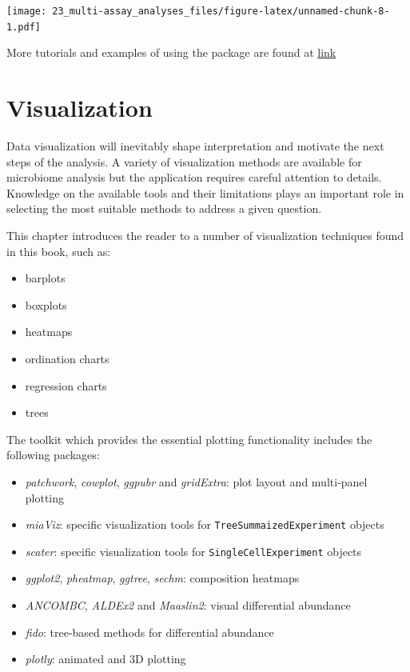 \documentclass[
]{book}
\providecommand{\tightlist}{%
  \setlength{\itemsep}{0pt}\setlength{\parskip}{0pt}}
\begin{document}
\texttt{[image: 23\_multi-assay\_analyses\_files/figure-latex/unnamed-chunk-8-1.pdf]}

More tutorials and examples of using the package are found at \href{https://biofam.github.io/MOFA2/tutorials.html}{link}

\hypertarget{viz-chapter}{%
\chapter{Visualization}\label{viz-chapter}}

Data visualization will inevitably shape interpretation and motivate
the next steps of the analysis. A variety of visualization methods are
available for microbiome analysis but the application requires careful
attention to details. Knowledge on the available tools and their
limitations plays an important role in selecting the most suitable
methods to address a given question.

This chapter introduces the reader to a number of visualization
techniques found in this book, such as:

\begin{itemize}
\tightlist
\item
  barplots
\item
  boxplots
\item
  heatmaps
\item
  ordination charts
\item
  regression charts
\item
  trees
\end{itemize}

The toolkit which provides the essential plotting functionality
includes the following packages:

\begin{itemize}
\tightlist
\item
  \emph{patchwork}, \emph{cowplot}, \emph{ggpubr} and \emph{gridExtra}: plot layout and multi-panel plotting
\item
  \emph{miaViz}: specific visualization tools for \texttt{TreeSummaizedExperiment} objects
\item
  \emph{scater}: specific visualization tools for \texttt{SingleCellExperiment} objects
\item
  \emph{ggplot2}, \emph{pheatmap}, \emph{ggtree}, \emph{sechm}: composition heatmaps
\item
  \emph{ANCOMBC}, \emph{ALDEx2} and \emph{Maaslin2}: visual differential abundance
\item
  \emph{fido}: tree-based methods for differential abundance
\item
  \emph{plotly}: animated and 3D plotting
\end{itemize}
\end{document}
